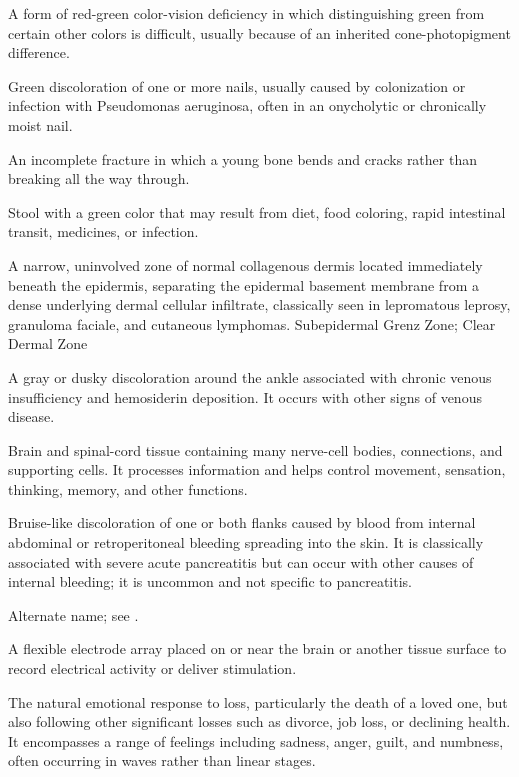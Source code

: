  A form of red-green color-vision deficiency in which distinguishing green from certain other colors is difficult, usually because of an inherited cone-photopigment difference.

 Green discoloration of one or more nails, usually caused by colonization or infection with Pseudomonas aeruginosa, often in an onycholytic or chronically moist nail.

 An incomplete fracture in which a young bone bends and cracks rather than breaking all the way through.

 Stool with a green color that may result from diet, food coloring, rapid intestinal transit, medicines, or infection.

 A narrow, uninvolved zone of normal collagenous dermis located immediately beneath the epidermis, separating the epidermal basement membrane from a dense underlying dermal cellular infiltrate, classically seen in lepromatous leprosy, granuloma faciale, and cutaneous lymphomas.
\synonyms
Subepidermal Grenz Zone; Clear Dermal Zone

 A gray or dusky discoloration around the ankle associated with chronic venous insufficiency and hemosiderin deposition. It occurs with other signs of venous disease.

 Brain and spinal-cord tissue containing many nerve-cell bodies, connections, and supporting cells. It processes information and helps control movement, sensation, thinking, memory, and other functions.

 Bruise-like discoloration of one or both flanks caused by blood from internal abdominal or retroperitoneal bleeding spreading into the skin. It is classically associated with severe acute pancreatitis but can occur with other causes of internal bleeding; it is uncommon and not specific to pancreatitis.

 Alternate name; see .

 A flexible electrode array placed on or near the brain or another tissue surface to record electrical
activity or deliver stimulation.

 The natural emotional response to loss, particularly the death of a loved one, but also following other significant losses such as divorce, job loss, or declining health. It encompasses a range of feelings including sadness, anger, guilt, and numbness, often occurring in waves rather than linear stages.

